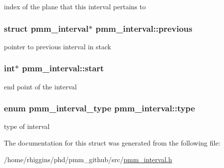 index of the plane that this interval pertains to \hypertarget{structpmm__interval_a55a49a209aa33004181e0af975cd558e}{
\subsubsection[{previous}]{\setlength{\rightskip}{0pt plus 5cm}struct {\bf pmm\-\_\-interval}$\ast$ pmm\-\_\-interval\-::previous}}\label{structpmm__interval_a55a49a209aa33004181e0af975cd558e}
pointer to previous interval in stack \hypertarget{structpmm__interval_a799c659f1aa43b1d109affe4bfdbd309}{
\subsubsection[{start}]{\setlength{\rightskip}{0pt plus 5cm}int$\ast$ pmm\-\_\-interval\-::start}}\label{structpmm__interval_a799c659f1aa43b1d109affe4bfdbd309}
end point of the interval \hypertarget{structpmm__interval_aa49aeaf84ef135481151dbff305fac3b}{
\subsubsection[{type}]{\setlength{\rightskip}{0pt plus 5cm}enum {\bf pmm\-\_\-interval\-\_\-type} pmm\-\_\-interval\-::type}}\label{structpmm__interval_aa49aeaf84ef135481151dbff305fac3b}
type of interval 

The documentation for this struct was generated from the following file\-:\begin{DoxyCompactItemize}
\item 
/home/rhiggins/phd/pmm\-\_\-github/src/\hyperlink{pmm__interval_8h}{pmm\-\_\-interval.\-h}\end{DoxyCompactItemize}
